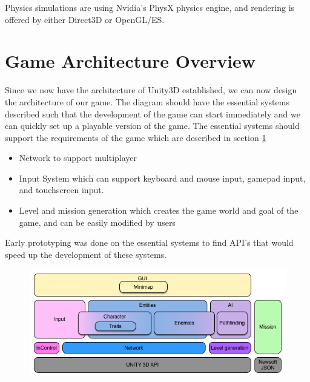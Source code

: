 Physics simulations are using Nvidia's PhysX physics engine, and rendering is
offered by either Direct3D or OpenGL/ES.

\section{Game Architecture Overview}
Since we now have the architecture of Unity3D established, we can now design the architecture of our game.
The diagram should have the essential systems described such that the development of the game can start immediately and we can quickly set up a playable version of the game.
The essential systems should support the requirements of the game which are described in section \ref{} 
\begin{itemize}
	\item Network to support multiplayer
	\item Input System which can support keyboard and mouse input, gamepad input, and touchscreen input.
	\item Level and mission generation which creates the game world and goal of the game, and can be easily modified by users
\end{itemize}
Early prototyping was done on the essential systems to find API's that would speed up the development of these systems.


\begin{figure}
\includegraphics[width = \textwidth]{figures/architecture/game_architecture_overview.png}
\end{figure}

